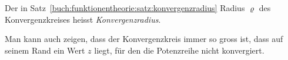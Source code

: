 \begin{definition}
\label{buch:funktionentheorie:definition:konvergenzradius}
%
Der in Satz~\ref{buch:funktionentheorie:satz:konvergenzradius}
Radius $\varrho$ des Konvergenzkreises heisst {\em Konvergenzradius}.
\end{definition}

Man kann auch zeigen, dass der Konvergenzkreis immer so gross ist,
dass auf seinem Rand ein Wert $z$ liegt, für den die Potenzreihe nicht
konvergiert.

